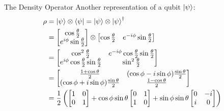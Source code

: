 \documentclass{beamer}
\begin{document}
\begin{frame}{The Density Operator\tiny\cite{rotationsonblochsphere}}
  {\tiny
  Another representation of a qubit $\ket{\psi}$:
    \begin{align*}
      \rho &= \ket{\psi} \otimes \bra{\psi} = \ket{\psi} \otimes \ket{\psi}^{\dagger} \\
           &= \begin{bmatrix}
                \cos{\frac{\theta}2} \\
                e^{i\phi}\sin{\frac{\theta}2}
              \end{bmatrix}
              \otimes
              \begin{bmatrix}
                \cos{\frac{\theta}2} & e^{-i\phi}\sin{\frac{\theta}2}
              \end{bmatrix} \\
           &= \begin{bmatrix}
                \cos^2{\frac{\theta}2}                            & e^{-i\phi}\cos{\frac{\theta}2}\sin{\frac{\theta}2} \\
                e^{i\phi}\cos{\frac{\theta}2}\sin{\frac{\theta}2} & \sin^2{\frac{\theta}2}
              \end{bmatrix} \\
           &= \begin{bmatrix}
                \frac{1+\cos{\theta}}2                       & (\cos{\phi}-i\sin{\phi})\frac{\sin\theta}2 \\
                (\cos{\phi}+i\sin{\phi})\frac{\sin\theta}2   & \frac{1-\cos{\theta}}2
              \end{bmatrix} \\
           &= \frac{1}2
              \begin{pmatrix}
                \begin{bmatrix}
                  1 & 0 \\
                  0 & 1
                \end{bmatrix}
                +
                \cos\phi\sin\theta
                \begin{bmatrix}
                  0 & 1 \\
                  1 & 0
                \end{bmatrix}
                +
                \sin\phi\sin\theta
                \begin{bmatrix}
                  0 & -i \\
                  i & 0
                \end{bmatrix}

\end{pmatrix}
\end{align*}}
\end{frame}
\end{document}
